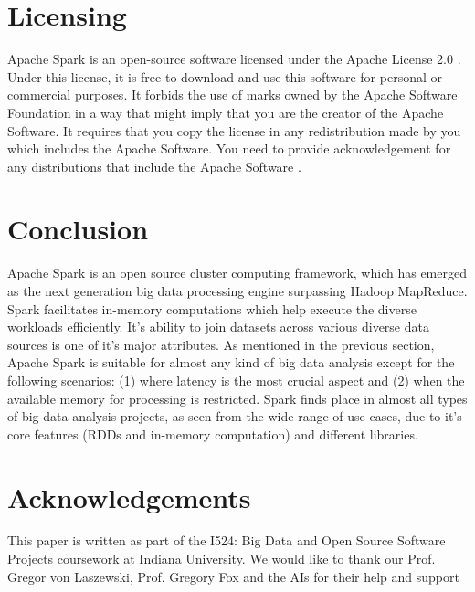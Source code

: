 \documentclass[9pt,twocolumn,twoside]{../../styles/osajnl}
\begin{document}
\section{Licensing}
Apache Spark is an open-source software licensed under the Apache
License 2.0 \cite{www-apache-lic}. Under this license, it is free to
download and use this software for personal or commercial purposes. It
forbids the use of marks owned by the Apache Software Foundation in a
way that might imply that you are the creator of the Apache
Software. It requires that you copy the license in any redistribution
made by you which includes the Apache Software. You need to provide
acknowledgement for any distributions that include the Apache Software
\cite{www-apache-lic}.

\section{Conclusion}
Apache Spark is an open source cluster computing framework, which has
emerged as the next generation big data processing engine surpassing
Hadoop MapReduce. Spark facilitates in-memory computations which help
execute the diverse workloads efficiently. It's ability to join
datasets across various diverse data sources is one of it's major
attributes. As mentioned in the previous section, Apache Spark is
suitable for almost any kind of big data analysis except for the
following scenarios: (1) where latency is the most crucial aspect and
(2) when the available memory for processing is restricted. Spark
finds place in almost all types of big data analysis projects, as seen
from the wide range of use cases, due to it's core features (RDDs and
in-memory computation) and different libraries.

\section*{Acknowledgements}

This paper is written as part of the I524: Big Data and Open Source
Software Projects coursework at Indiana University. We would like to
thank our Prof. Gregor von Laszewski, Prof. Gregory Fox and the AIs
for their help and support



 
\end{document}
